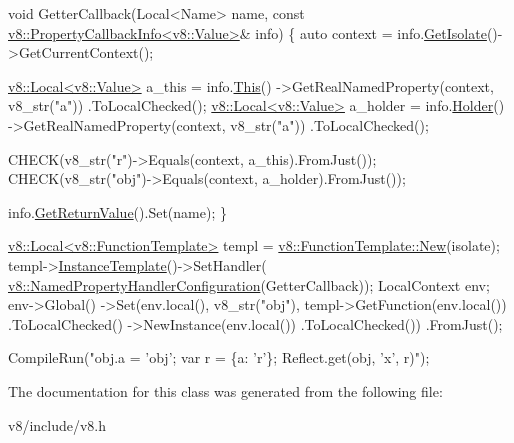 \begin{DoxyCode}
\textcolor{keywordtype}{void} GetterCallback(Local<Name> name,
                    \textcolor{keyword}{const} \mbox{\hyperlink{classv8_1_1PropertyCallbackInfo}{v8::PropertyCallbackInfo<v8::Value>}}& info) \{
   \textcolor{keyword}{auto} context = info.\mbox{\hyperlink{classv8_1_1PropertyCallbackInfo_aff7b838ede308ab8a42890962eb9271c}{GetIsolate}}()->GetCurrentContext();

   \mbox{\hyperlink{classv8_1_1Local}{v8::Local<v8::Value>}} a\_this =
       info.\mbox{\hyperlink{classv8_1_1PropertyCallbackInfo_af46300339d2f31d8dc84a06d74ed6c3c}{This}}()
           ->GetRealNamedProperty(context, v8\_str(\textcolor{stringliteral}{"a"}))
           .ToLocalChecked();
   \mbox{\hyperlink{classv8_1_1Local}{v8::Local<v8::Value>}} a\_holder =
       info.\mbox{\hyperlink{classv8_1_1PropertyCallbackInfo_a66b7ec267f18bd84e8baf0a0e16187b9}{Holder}}()
           ->GetRealNamedProperty(context, v8\_str(\textcolor{stringliteral}{"a"}))
           .ToLocalChecked();

  CHECK(v8\_str(\textcolor{stringliteral}{"r"})->Equals(context, a\_this).FromJust());
  CHECK(v8\_str(\textcolor{stringliteral}{"obj"})->Equals(context, a\_holder).FromJust());

  info.\mbox{\hyperlink{classv8_1_1PropertyCallbackInfo_aa0882946929c3c4df6d131fe0d8d6746}{GetReturnValue}}().Set(name);
\}

\mbox{\hyperlink{classv8_1_1Local}{v8::Local<v8::FunctionTemplate>}} templ =
\mbox{\hyperlink{classv8_1_1FunctionTemplate_a0724f26034d01ce76bd106b193ab7e7a}{v8::FunctionTemplate::New}}(isolate);
templ->\mbox{\hyperlink{classv8_1_1FunctionTemplate_a00dd9725566908e8fd14064542f5a781}{InstanceTemplate}}()->SetHandler(
    \mbox{\hyperlink{structv8_1_1NamedPropertyHandlerConfiguration}{v8::NamedPropertyHandlerConfiguration}}(GetterCallback));
LocalContext env;
env->Global()
    ->Set(env.local(), v8\_str(\textcolor{stringliteral}{"obj"}), templ->GetFunction(env.local())
                                         .ToLocalChecked()
                                         ->NewInstance(env.local())
                                         .ToLocalChecked())
    .FromJust();

CompileRun(\textcolor{stringliteral}{"obj.a = 'obj'; var r = \{a: 'r'\}; Reflect.get(obj, 'x', r)"});
\end{DoxyCode}
 

The documentation for this class was generated from the following file\+:\begin{DoxyCompactItemize}
\item 
v8/include/v8.\+h\end{DoxyCompactItemize}
